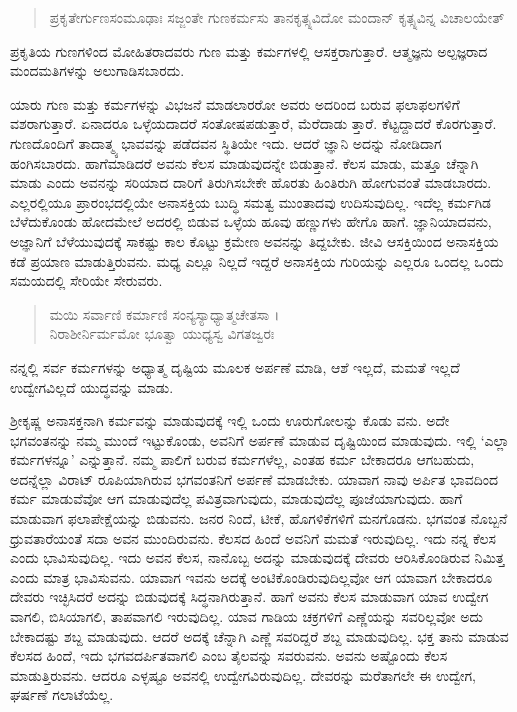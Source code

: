 \begin{verse}
ಪ್ರಕೃತೇರ್ಗುಣಸಂಮೂಢಾಃ ಸಜ್ಜಂತೇ ಗುಣಕರ್ಮಸು ತಾನಕೃತ್ಸ್ನವಿದೋ ಮಂದಾನ್ ಕೃತ್ಸ್ನವಿನ್ನ ವಿಚಾಲಯೇತ್ 
\end{verse}

{\small ಪ್ರಕೃತಿಯ ಗುಣಗಳಿಂದ ಮೋಹಿತರಾದವರು ಗುಣ ಮತ್ತು ಕರ್ಮಗಳಲ್ಲಿ ಆಸಕ್ತರಾಗುತ್ತಾರೆ. ಆತ್ಮಜ್ಞನು ಅಲ್ಪಜ್ಞರಾದ ಮಂದಮತಿಗಳನ್ನು ಅಲುಗಾಡಿಸಬಾರದು.}

ಯಾರು ಗುಣ ಮತ್ತು ಕರ್ಮಗಳನ್ನು ವಿಭಜನೆ ಮಾಡಲಾರರೋ ಅವರು ಅದರಿಂದ ಬರುವ ಫಲಾಫಲಗಳಿಗೆ ವಶರಾಗುತ್ತಾರೆ. ಏನಾದರೂ ಒಳ್ಳೆಯದಾದರೆ ಸಂತೋಷಪಡುತ್ತಾರೆ, ಮೆರೆದಾಡು ತ್ತಾರೆ. ಕೆಟ್ಟದ್ದಾದರೆ ಕೊರಗುತ್ತಾರೆ. ಗುಣದೊಂದಿಗೆ ತಾದಾತ್ಮ್ಯ ಭಾವವನ್ನು ಪಡೆದವನ ಸ್ಥಿತಿಯೇ ಇದು. ಆದರೆ ಜ್ಞಾನಿ ಅದನ್ನು ನೋಡಿದಾಗ ಹಂಗಿಸಬಾರದು. ಹಾಗೆಮಾಡಿದರೆ ಅವನು ಕೆಲಸ ಮಾಡುವುದನ್ನೇ ಬಿಡುತ್ತಾನೆ. ಕೆಲಸ ಮಾಡು, ಮತ್ತೂ ಚೆನ್ನಾಗಿ ಮಾಡು ಎಂದು ಅವನನ್ನು ಸರಿಯಾದ ದಾರಿಗೆ ತಿರುಗಿಸಬೇಕೇ ಹೊರತು ಹಿಂತಿರುಗಿ ಹೋಗುವಂತೆ ಮಾಡಬಾರದು. ಎಲ್ಲರಲ್ಲಿಯೂ ಪ್ರಾರಂಭದಲ್ಲಿಯೇ ಅನಾಸಕ್ತಿಯ ಬುದ್ಧಿ ಸಮತ್ವ ಮುಂತಾದವು ಉದಿಸುವುದಿಲ್ಲ. ಇದೆಲ್ಲ ಕರ್ಮಗಿಡ ಬೆಳೆದುಕೊಂಡು ಹೋದಮೇಲೆ ಅದರಲ್ಲಿ ಬಿಡುವ ಒಳ್ಳೆಯ ಹೂವು ಹಣ್ಣುಗಳು ಹೇಗೊ ಹಾಗೆ. ಜ್ಞಾನಿಯಾದವನು, ಅಜ್ಞಾನಿಗೆ ಬೆಳೆಯುವುದಕ್ಕೆ ಸಾಕಷ್ಟು ಕಾಲ ಕೊಟ್ಟು ಕ್ರಮೇಣ ಅವನನ್ನು ತಿದ್ದಬೇಕು. ಜೀವಿ ಆಸಕ್ತಿಯಿಂದ ಅನಾಸಕ್ತಿಯ ಕಡೆ ಪ್ರಯಾಣ ಮಾಡುತ್ತಿರುವನು. ಮಧ್ಯ ಎಲ್ಲೂ ನಿಲ್ಲದೆ ಇದ್ದರೆ ಅನಾಸಕ್ತಿಯ ಗುರಿಯನ್ನು ಎಲ್ಲರೂ ಒಂದಲ್ಲ ಒಂದು ಸಮಯದಲ್ಲಿ ಸೇರಿಯೇ ಸೇರುವರು.

\begin{verse}
ಮಯಿ ಸರ್ವಾಣಿ ಕರ್ಮಾಣಿ ಸಂನ್ಯಸ್ಯಾಧ್ಯಾತ್ಮಚೇತಸಾ ।\\ನಿರಾಶೀರ್ನಿರ್ಮಮೋ ಭೂತ್ವಾ ಯುಧ್ಯಸ್ವ ವಿಗತಜ್ವರಃ 
\end{verse}

{\small ನನ್ನಲ್ಲಿ ಸರ್ವ ಕರ್ಮಗಳನ್ನು ಅಧ್ಯಾತ್ಮ ದೃಷ್ಟಿಯ ಮೂಲಕ ಅರ್ಪಣೆ ಮಾಡಿ, ಆಶೆ ಇಲ್ಲದೆ, ಮಮತೆ ಇಲ್ಲದೆ ಉದ್ವೇಗವಿಲ್ಲದೆ ಯುದ್ಧವನ್ನು ಮಾಡು.}

ಶ್ರೀಕೃಷ್ಣ ಅನಾಸಕ್ತನಾಗಿ ಕರ್ಮವನ್ನು ಮಾಡುವುದಕ್ಕೆ ಇಲ್ಲಿ ಒಂದು ಊರುಗೋಲನ್ನು ಕೊಡು ವನು. ಅದೇ ಭಗವಂತನನ್ನು ನಮ್ಮ ಮುಂದೆ ಇಟ್ಟುಕೊಂಡು, ಅವನಿಗೆ ಅರ್ಪಣೆ ಮಾಡುವ ದೃಷ್ಟಿಯಿಂದ ಮಾಡುವುದು. ಇಲ್ಲಿ ‘ಎಲ್ಲಾ ಕರ್ಮಗಳನ್ನೂ’ ಎನ್ನುತ್ತಾನೆ. ನಮ್ಮ ಪಾಲಿಗೆ ಬರುವ ಕರ್ಮಗಳೆಲ್ಲ, ಎಂತಹ ಕರ್ಮ ಬೇಕಾದರೂ ಆಗಬಹುದು, ಅದನ್ನೆಲ್ಲಾ ವಿರಾಟ್ ರೂಪಿಯಾಗಿರುವ ಭಗವಂತನಿಗೆ ಅರ್ಪಣೆ ಮಾಡಬೇಕು. ಯಾವಾಗ ನಾವು ಅರ್ಪಿತ ಭಾವದಿಂದ ಕರ್ಮ ಮಾಡುವೆವೋ ಆಗ ಮಾಡುವುದೆಲ್ಲ ಪವಿತ್ರವಾಗುವುದು, ಮಾಡುವುದೆಲ್ಲ ಪೂಜೆಯಾಗುವುದು. ಹಾಗೆ ಮಾಡುವಾಗ ಫಲಾಪೇಕ್ಷೆಯನ್ನು ಬಿಡುವನು. ಜನರ ನಿಂದೆ, ಟೀಕೆ, ಹೊಗಳಿಕೆಗಳಿಗೆ ಮನಗೊಡನು. ಭಗವಂತ ನೊಬ್ಬನೆ ಧ್ರುವತಾರೆಯಂತೆ ಸದಾ ಅವನ ಮುಂದಿರುವನು. ಕೆಲಸದ ಹಿಂದೆ ಅವನಿಗೆ ಮಮತೆ ಇರುವುದಿಲ್ಲ. ಇದು ನನ್ನ ಕೆಲಸ ಎಂದು ಭಾವಿಸುವುದಿಲ್ಲ. ಇದು ಅವನ ಕೆಲಸ, ನಾನೊಬ್ಬ ಅದನ್ನು ಮಾಡುವುದಕ್ಕೆ ದೇವರು ಆರಿಸಿಕೊಂಡಿರುವ ನಿಮಿತ್ತ ಎಂದು ಮಾತ್ರ ಭಾವಿಸುವನು. ಯಾವಾಗ ಇವನು ಅದಕ್ಕೆ ಅಂಟಿಕೊಂಡಿರುವುದಿಲ್ಲವೋ ಆಗ ಯಾವಾಗ ಬೇಕಾದರೂ ದೇವರು ಇಚ್ಛಿಸಿದರೆ ಅದನ್ನು ಬಿಡುವುದಕ್ಕೆ ಸಿದ್ಧನಾಗಿರುತ್ತಾನೆ. ಹಾಗೆ ಅವನು ಕೆಲಸ ಮಾಡುವಾಗ ಯಾವ ಉದ್ವೇಗ ವಾಗಲಿ, ಬಿಸಿಯಾಗಲಿ, ತಾಪವಾಗಲಿ ಇರುವುದಿಲ್ಲ. ಯಾವ ಗಾಡಿಯ ಚಕ್ರಗಳಿಗೆ ಎಣ್ಣೆಯನ್ನು ಸವರಿಲ್ಲವೋ ಅದು ಬೇಕಾದಷ್ಟು ಶಬ್ದ ಮಾಡುವುದು. ಆದರೆ ಅದಕ್ಕೆ ಚೆನ್ನಾಗಿ ಎಣ್ಣೆ ಸವರಿದ್ದರೆ ಶಬ್ದ ಮಾಡುವುದಿಲ್ಲ. ಭಕ್ತ ತಾನು ಮಾಡುವ ಕೆಲಸದ ಹಿಂದೆ, ಇದು ಭಗವದರ್ಪಿತವಾಗಲಿ ಎಂಬ ತೈಲವನ್ನು ಸವರುವನು. ಅವನು ಅಷ್ಟೊಂದು ಕೆಲಸ ಮಾಡುತ್ತಿರುವನು. ಆದರೂ ಎಳ್ಳಷ್ಟೂ ಅವನಲ್ಲಿ ಉದ್ವೇಗವಿರುವುದಿಲ್ಲ. ದೇವರನ್ನು ಮರೆತಾಗಲೇ ಈ ಉದ್ವೇಗ, ಘರ್ಷಣೆ ಗಲಾಟೆಯೆಲ್ಲ.

